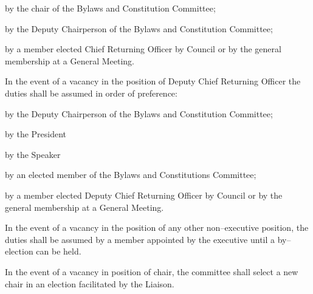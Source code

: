 \begin{longenum}[ label*=\thesubsection.\arabic*., align=left]
\begin{longenum}[ label*=\arabic*., align=left]
\begin{longenum}[ label*=\arabic*., align=left]
				\item by the chair of the Bylaws and Constitution Committee;
				\item by the Deputy Chairperson of the Bylaws and Constitution Committee;
				\item by a member elected Chief Returning Officer by Council or by the general membership at a General Meeting.
			\end{longenum}
			\item In the event of a vacancy in the position of Deputy Chief Returning Officer the duties shall be assumed in order of preference:
			\begin{longenum}[ label*=\arabic*., align=left]
				\item by the Deputy Chairperson of the Bylaws and Constitution Committee;
				\item by the President
				\item by the Speaker
                \item by an elected member of the Bylaws and Constitutions Committee;
                \item by a member elected Deputy Chief Returning Officer by Council or by the general membership at a General Meeting.
			\end{longenum}
			\item In the event of a vacancy in the position of any other non--executive position, the duties shall be assumed by a member appointed by the executive until a by--election can be held.
			\item In the event of a vacancy in position of chair, the committee shall select a new chair in an election facilitated by the Liaison.
		\end{longenum}
	\end{longenum}
